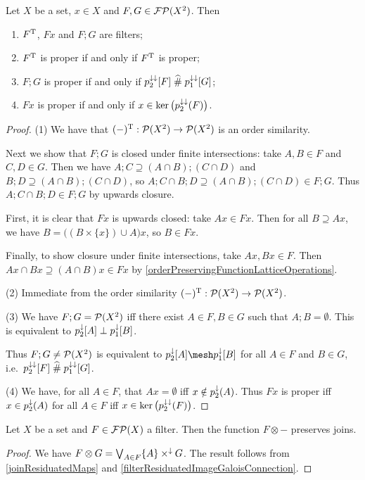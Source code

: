 \begin{lemma} \label{filterOperationsOnRelationFilters}
Let $X$ be a set, $x\in X$ and $F,G\in\operatorname{\mathcal{FP}}(X^2)$. Then
\begin{enumerate}
\item $F^{\mathrm{T}}$, $Fx$ and $F;G$ are filters;
\item $F^{\mathrm{T}}$ is proper \textup{if and only if} $F^{\mathrm{T}}$ is proper;
\item $F;G$ is proper \textup{if and only if} $p_2^{\downarrow\downarrow}[F]\mathrel{\widehat{\#}} p_1^{\downarrow\downarrow}[G]$;
\item $Fx$ is proper \textup{if and only if} $x\in\ker\big(p_2^{\downarrow\downarrow}(F)\big)$.
\end{enumerate}
\end{lemma}
\begin{proof}
(1) We have that $(-)^{\mathrm{T}}:\operatorname{\mathcal{P}}(X^2)\to\operatorname{\mathcal{P}}(X^2)$ is an order similarity. 

Next we show that $F;G$ is closed under finite intersections: take $A,B\in F$ and $C,D\in G$. Then we have $A;C \supseteq (A\cap B);(C\cap D)$ and $B;D \supseteq (A\cap B);(C\cap D)$, so $A;C \cap B;D \supseteq (A\cap B);(C\cap D) \in F;G$. Thus $A;C \cap B;D\in F;G$ by upwards closure.

First, it is clear that $Fx$ is upwards closed: take $Ax\in Fx$. Then for all $B\supseteq Ax$, we have $B = \big((B\times\{x\})\cup A\big)x$, so $B\in Fx$.

Finally, to show closure under finite intersections, take $Ax, Bx\in F$. Then $Ax\cap Bx \supseteq (A\cap B)x \in Fx$ by \ref{orderPreservingFunctionLatticeOperations}.

(2) Immediate from the order similarity $(-)^{\mathrm{T}}:\operatorname{\mathcal{P}}(X^2)\to\operatorname{\mathcal{P}}(X^2)$.

(3) We have $F;G = \operatorname{\mathcal{P}}(X^2)$ iff there exist $A\in F,B\in G$ such that $A;B = \emptyset$. This is equivalent to $p_2^{\downarrow}[A]\perp p_1^{\downarrow}[B]$.

Thus $F;G \neq \operatorname{\mathcal{P}}(X^2)$ is equivalent to $p_2^{\imf}[A]\mesh p_1^{\imf}[B]$ for all $A\in F$ and $B\in G$, i.e.\ $p_2^{\downarrow\downarrow}[F]\mathrel{\widehat{\#}} p_1^{\downarrow\downarrow}[G]$.

(4) We have, for all $A\in F$, that $Ax = \emptyset$ iff $x\notin p_2^\downarrow(A)$. Thus $Fx$ is proper iff $x\in p_2^\downarrow(A)$ for all $A\in F$ iff $x\in \ker\big(p_2^{\downarrow\downarrow}(F)\big)$.
\end{proof}

\begin{proposition}
Let $X$ be a set and $F\in\operatorname{\mathcal{FP}}(X)$ a filter. Then the function $F\otimes -$ preserves joins.
\end{proposition}
\begin{proof}
We have $F\otimes G = \bigvee_{A\in F}\{A\}\times^{\downarrow}G$. The result follows from \ref{joinResiduatedMaps} and \ref{filterResiduatedImageGaloisConnection}.
\end{proof}

